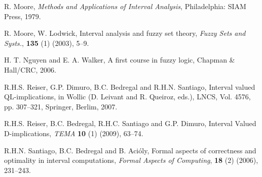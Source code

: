\documentclass[12pt]{article}
\theoremstyle{plain}
\theoremstyle{remark}
\theoremstyle{definition}
\theoremstyle{proposition}
\begin{document}
\begin{thebibliography}{8}
{%

R. Moore, \emph{Methods and Applications of Interval Analysis}, Philadelphia: SIAM Press, 1979.

R. Moore, W. Lodwick, Interval analysis and fuzzy set theory, {\em
Fuzzy Sets and Systs.}, {\bf 135} (1) (2003),
5--9.

 H. T. Nguyen and E. A. Walker, A first course in
fuzzy logic, Chapman \& Hall/CRC, 2006.


%

R.H.S. Reiser, G.P. Dimuro, B.C. Bedregal and R.H.N. Santiago, Interval valued {QL}-implications, in Wollic (D. Leivant and R.  Queiroz, eds.),  LNCS, Vol. 4576, pp. 307--321, Springer, Berlim,
2007.


 R.H.S. Reiser, B.C. Bedregal, R.H.C. Santiago and G.P. Dimuro,
Interval Valued {D}-implications, \emph{TEMA} \textbf{10} (1)
(2009), 63--74.

%

R.H.N. Santiago, B.C. Bedregal and  B. Aci\'oly, Formal aspects of correctness and optimality in interval
  computations, \emph{Formal Aspects of Computing}, \textbf{18} (2) (2006),  231--243.


}
\end{thebibliography}
\end{document}
